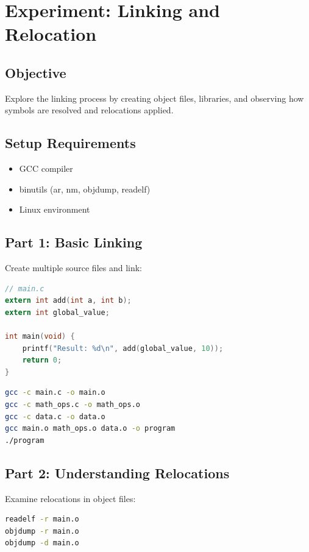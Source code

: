 \section{Experiment: Linking and Relocation}

\subsection{Objective}
Explore the linking process by creating object files, libraries, and observing how symbols are resolved and relocations applied.

\subsection{Setup Requirements}
\begin{itemize}
\item GCC compiler
\item binutils (ar, nm, objdump, readelf)
\item Linux environment
\end{itemize}

\subsection{Part 1: Basic Linking}

Create multiple source files and link:

\begin{lstlisting}[language=C]
// main.c
extern int add(int a, int b);
extern int global_value;

int main(void) {
    printf("Result: %d\n", add(global_value, 10));
    return 0;
}
\end{lstlisting}

\begin{lstlisting}[language=bash]
gcc -c main.c -o main.o
gcc -c math_ops.c -o math_ops.o
gcc -c data.c -o data.o
gcc main.o math_ops.o data.o -o program
./program
\end{lstlisting}

\subsection{Part 2: Understanding Relocations}

Examine relocations in object files:

\begin{lstlisting}[language=bash]
readelf -r main.o
objdump -r main.o
objdump -d main.o
\end{lstlisting}

